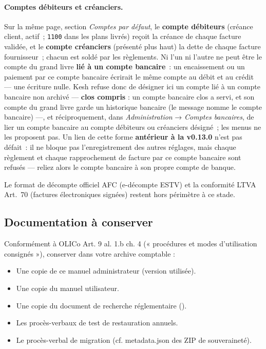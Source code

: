\documentclass[a4paper,11pt,oneside]{article}
\begin{document}
\paragraph{Comptes débiteurs et créanciers.} Sur la même page, section \emph{Comptes par défaut}, le \textbf{compte débiteurs} (créance client, actif~; \texttt{1100} dans les plans livrés) reçoit la créance de chaque facture validée, et le \textbf{compte créanciers} (présenté plus haut) la dette de chaque facture fournisseur~; chacun est soldé par les règlements. Ni l'un ni l'autre ne peut être le compte du grand livre \textbf{lié à un compte bancaire}~: un encaissement ou un paiement par ce compte bancaire écrirait le même compte au débit et au crédit --- une écriture nulle. Kesh refuse donc de désigner ici un compte lié à un compte bancaire non archivé --- \textbf{clos compris} : un compte bancaire clos a servi, et son compte du grand livre garde un historique bancaire (le message nomme le compte bancaire) ---, et réciproquement, dans \emph{Administration} → \emph{Comptes bancaires}, de lier un compte bancaire au compte débiteurs ou créanciers désigné~; les menus ne les proposent pas. Un lien de cette forme \textbf{antérieur à la v0.13.0} n'est pas défait~: il ne bloque pas l'enregistrement des autres réglages, mais chaque règlement et chaque rapprochement de facture par ce compte bancaire sont refusés --- reliez alors le compte bancaire à son propre compte de banque.

Le format de décompte officiel AFC (e-décompte ESTV) et la conformité LTVA Art.~70 (factures électroniques signées) restent hors périmètre à ce stade.

\subsection{Documentation à conserver}

Conformément à OLICo Art. 9 al. 1.b ch. 4 (« procédures et modes d'utilisation consignés »), conserver dans votre archive comptable :

\begin{itemize}
    \item Une copie de ce manuel administrateur (version utilisée).
    \item Une copie du manuel utilisateur.
    \item Une copie du document de recherche réglementaire ().
    \item Les procès-verbaux de test de restauration annuels.
    \item Le procès-verbal de migration (cf. metadata.json des ZIP de souveraineté).
\end{itemize}
\end{document}
